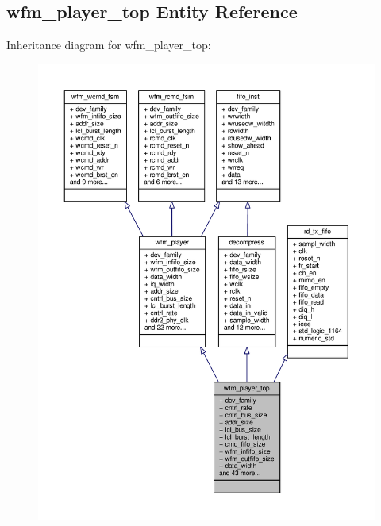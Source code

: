 \subsection{wfm\+\_\+player\+\_\+top Entity Reference}
\label{classwfm__player__top}


Inheritance diagram for wfm\+\_\+player\+\_\+top\+:\nopagebreak
\begin{figure}[H]
\begin{center}
\leavevmode
\includegraphics[width=350pt]{d3/d91/classwfm__player__top__inherit__graph}
\end{center}
\end{figure}


